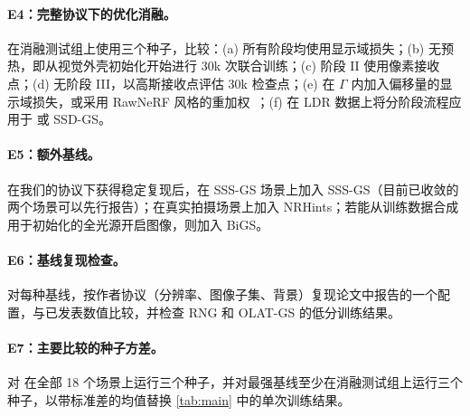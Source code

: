 \documentclass[10pt,twocolumn,letterpaper]{article}
\begin{document}
\paragraph{E4：完整协议下的优化消融。}
在消融测试组上使用三个种子，比较：(a) 所有阶段均使用显示域损失；(b) 无预热，即从视觉外壳初始化开始进行 30k 次联合训练；(c) 阶段 II 使用像素接收点；(d) 无阶段 III，以高斯接收点评估 30k 检查点；(e) 在 $\Gamma$ 内加入偏移量的显示域损失，或采用 RawNeRF 风格的重加权~\cite{mildenhall2022nerf}；(f) 在 LDR 数据上将分阶段流程应用于 \gsthree 或 SSD-GS。

\paragraph{E5：额外基线。}
在我们的协议下获得稳定复现后，在 SSS-GS 场景上加入 SSS-GS（目前已收敛的两个场景可以先行报告）；在真实拍摄场景上加入 NRHints；若能从训练数据合成用于初始化的全光源开启图像，则加入 BiGS。

\paragraph{E6：基线复现检查。}
对每种基线，按作者协议（分辨率、图像子集、背景）复现论文中报告的一个配置，与已发表数值比较，并检查 RNG 和 OLAT-GS 的低分训练结果。

\paragraph{E7：主要比较的种子方差。}
对 \ours 在全部 18 个场景上运行三个种子，并对最强基线至少在消融测试组上运行三个种子，以带标准差的均值替换 \cref{tab:main} 中的单次训练结果。
\end{document}
